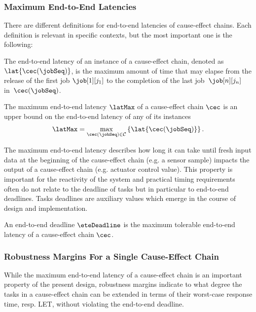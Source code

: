 \subsubsection{Maximum End-to-End Latencies}
There are different definitions for end-to-end latencies of cause-effect chains.  
Each definition is relevant in specific contexts, but the most important one is the following:
%
\begin{definition}
The end-to-end latency  of an instance of a cause-effect chain, denoted as $\lat{\cec(\jobSeq)}$, is the maximum amount of time that may elapse from the release of the first job $\job[1][j_1]$ to the completion of the last job~$\job[n][j_n]$ in~$\cec(\jobSeq)$.
\end{definition}
%
\begin{definition}
The maximum end-to-end latency $\latMax$ of a cause-effect chain $\cec$ is an upper bound on the end-to-end latency of any of its instances
\begin{align*}
	\latMax =
	\max_{\cec(\jobSeq) \in \mathcal{C}} 
	\left\{ 
	\lat{\cec(\jobSeq)} 
	\right\}.
\end{align*}
\end{definition}

The maximum end-to-end latency describes how long it can take until fresh input data at the beginning of the cause-effect chain (e.g. a sensor sample) impacts the output of a cause-effect chain (e.g. actuator control value).
This property is important for the reactivity of the system and practical timing requirements often do not  relate to the deadline of tasks but in particular to end-to-end deadlines. 
Tasks deadlines are auxiliary values which emerge in the course of design and implementation.
%
\begin{definition}
An end-to-end deadline $\eteDeadline$ is the maximum tolerable end-to-end latency of a cause-effect chain $\cec$.
\end{definition}
%


\subsubsection{Robustness Margins For a Single Cause-Effect Chain}
While the maximum end-to-end latency of a cause-effect chain is an important property of the present design, robustness margins indicate to what degree the tasks in a cause-effect chain can be extended in terms of their worst-case response time, resp. LET, without violating the end-to-end deadline. 
\bigskip

